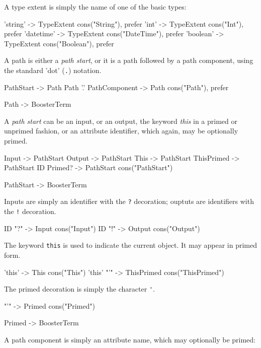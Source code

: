 A type extent is simply the name of one of the basic types:
\begin{code}
'string'	-> TypeExtent {cons("String"), prefer}
'int'		-> TypeExtent {cons("Int"), prefer}
'datetime'	-> TypeExtent {cons("DateTime"), prefer}
'boolean'	-> TypeExtent {cons("Boolean"), prefer}
\end{code}

A path is either a \emph{path start}, or it is a path followed by a
path component, using the standard 'dot' (\verb|.|) notation.

\begin{code}
PathStart -> Path
Path '.' PathComponent -> Path {cons("Path"), prefer}

Path -> BoosterTerm
\end{code}

A \emph{path start} can be an input, or an output, the keyword
\emph{this} in a primed or unprimed fashion, or an attribute
identifier, which again, may be optionally primed.

\begin{code}
Input         -> PathStart
Output        -> PathStart
This          -> PathStart
ThisPrimed    -> PathStart
ID Primed? -> PathStart {cons("PathStart")}

PathStart     -> BoosterTerm
\end{code}

Inputs are simply an identifier with the \verb|?| decoration; ouptuts
are identifiers with the \verb|!| decoration.

\begin{code}
ID "?" -> Input {cons("Input")}
ID "!" -> Output {cons("Output")}
\end{code}

The keyword \verb|this| is used to indicate the current object.  It
may appear in primed form.

\begin{code}
'this' -> This {cons("This")}
'this' "'" -> ThisPrimed {cons("ThisPrimed")}
\end{code}

The primed decoration is simply the character \verb|'|.

\begin{code}
"'" -> Primed {cons("Primed")}
	
Primed -> BoosterTerm
\end{code}

A path component is simply an attribute name, which may optionally be
primed:

